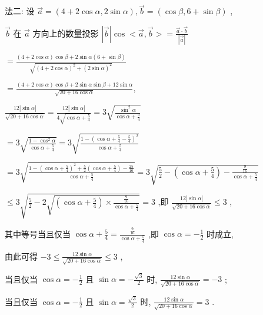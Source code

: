 \documentclass[10pt]{article}
\begin{document}
法二: 设 \(\overrightarrow{a} = \left( {4 + 2\cos \alpha ,2\sin \alpha }\right) ,\overrightarrow{b} = \left( {\cos \beta ,6 + \sin \beta }\right)\) ,

\(\overrightarrow{b}\) 在 \(\overrightarrow{a}\) 方向上的数量投影 \(\left| \overrightarrow{b}\right| \cos  < \overrightarrow{a},\overrightarrow{b} >  = \frac{\overrightarrow{a} \cdot  \overrightarrow{b}}{\left| \overrightarrow{a}\right| }\)

\(= \frac{\left( {4 + 2\cos \alpha }\right) \cos \beta  + 2\sin \alpha \left( {6 + \sin \beta }\right) }{\sqrt{{\left( 4 + 2\cos \alpha \right) }^{2} + {\left( 2\sin \alpha \right) }^{2}}}\)

\(= \frac{\left( {4 + 2\cos \alpha }\right) \cos \beta  + 2\sin \alpha \sin \beta  + {12}\sin \alpha }{\sqrt{{20} + {16}\cos \alpha }},\)

\(\frac{{12}\left| {\sin \alpha }\right| }{\sqrt{{20} + {16}\cos \alpha }} = \frac{{12}\left| {\sin \alpha }\right| }{4\sqrt{\cos \alpha  + \frac{5}{4}}} = 3\sqrt{\frac{{\sin }^{2}\alpha }{\cos \alpha  + \frac{5}{4}}}\)

\(= 3\sqrt{\frac{1 - {\cos }^{2}\alpha }{\cos \alpha  + \frac{5}{4}}} = 3\sqrt{\frac{1 - {\left( \cos \alpha  + \frac{5}{4} - \frac{5}{4}\right) }^{2}}{\cos \alpha  + \frac{5}{4}}}\)

\(= 3\sqrt{\frac{1 - {\left( \cos \alpha  + \frac{5}{4}\right) }^{2} + \frac{5}{2}\left( {\cos \alpha  + \frac{5}{4}}\right)  - \frac{25}{16}}{\cos \alpha  + \frac{5}{4}}} = 3\sqrt{\frac{5}{2} - \left( {\cos \alpha  + \frac{5}{4}}\right)  - \frac{\frac{9}{16}}{\cos \alpha  + \frac{5}{4}}}\)

\(\leq  3\sqrt{\frac{5}{2} - 2\sqrt{\left( {\cos \alpha  + \frac{5}{4}}\right)  \times  \frac{\frac{9}{16}}{\cos \alpha  + \frac{5}{4}}}} = 3\) ,即 \(\frac{{12}\left| {\sin \alpha }\right| }{\sqrt{{20} + {16}\cos \alpha }} \leq  3\) ,

其中等号当且仅当 \(\cos \alpha  + \frac{5}{4} = \frac{\frac{9}{16}}{\cos \alpha  + \frac{5}{4}}\) ,即 \(\cos \alpha  =  - \frac{1}{2}\) 时成立,

由此可得 \(- 3 \leq  \frac{{12}\sin \alpha }{\sqrt{{20} + {16}\cos \alpha }} \leq  3\) ,

当且仅当 \(\cos \alpha  =  - \frac{1}{2}\) 且 \(\sin \alpha  =  - \frac{\sqrt{3}}{2}\) 时, \(\frac{{12}\sin \alpha }{\sqrt{{20} + {16}\cos \alpha }} =  - 3\) ;

当且仅当 \(\cos \alpha  =  - \frac{1}{2}\) 且 \(\sin \alpha  = \frac{\sqrt{3}}{2}\) 时, \(\frac{{12}\sin \alpha }{\sqrt{{20} + {16}\cos \alpha }} = 3\) .
\end{document}
